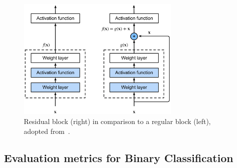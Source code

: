 \begin{figure}[ht]
  \centering
  \includegraphics[width=0.7\textwidth]{content/figures/residual_block.png}
  \caption{Residual block (right) in comparison to a regular block (left), adopted from~\cite{Zhang2023}.} 
  \label{fig:normal_and_residual_layer}
\end{figure}


\subsection{Evaluation metrics for Binary Classification}



